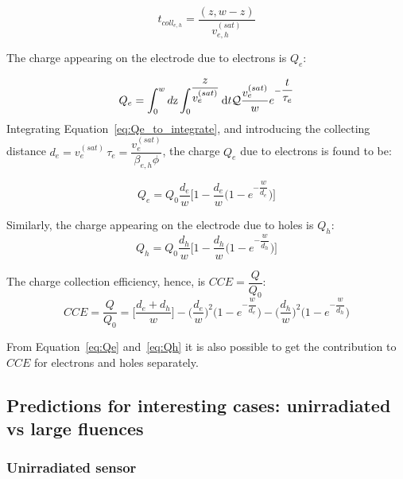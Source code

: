 \begin{equation}
t_{coll_{e,h}}=\dfrac{(z,w-z)}{v^{(sat)}_{e,h}}
\end{equation}

The charge appearing on the electrode due to electrons  is $Q_e$:

\begin{equation}
Q_e = \int_0^wd{\rm z}\int_0^{\dfrac{z}{v^{(sat)}_{e}}}{\rm d}t\mathcal{Q}\dfrac{v^{(sat)}_{e}}{w}e^{-\dfrac{t}{\tau_{e}}}
\label{eq:Qe_to_integrate}
\end{equation}
Integrating Equation~\ref{eq:Qe_to_integrate}, and introducing the collecting distance $d_e=v^{(sat)}_{e}\,\tau_{e}=\dfrac{v^{(sat)}_{e}}{\beta_{e,h}\phi}$, the charge  $Q_e$ due to electrons is found to be:

\begin{equation}
Q_e=Q_0\dfrac{d_e}{w}\Big[1-\dfrac{d_e}{w}\Big(1-e^{-\dfrac{w}{d_e}}\Big)\Big]
\label{eq:Qe}
\end{equation}

Similarly, the charge appearing on the electrode due to holes is $Q_h$:
\begin{equation}
Q_h=Q_0\dfrac{d_h}{w}\Big[1-\dfrac{d_h}{w}\Big(1-e^{-\dfrac{w}{d_h}}\Big)\Big]
\label{eq:Qh}
\end{equation}

The charge collection efficiency, hence, is  $CCE=\dfrac{Q}{Q_0}$:
\begin{equation}
CCE=\dfrac{Q}{Q_0}=\Big[\dfrac{d_e+d_h}{w}\Big]-\Big(\dfrac{d_e}{w}\Big)^2\Big(1-e^{-\dfrac{w}{d_e}}\Big)-\Big(\dfrac{d_h}{w}\Big)^2\Big(1-e^{-\dfrac{w}{d_h}}\Big)
\end{equation}

From Equation~\ref{eq:Qe} and~\ref{eq:Qh} it is also possible to get the contribution to $CCE$ 
for electrons and holes separately. 

\subsection{Predictions for interesting cases: unirradiated vs large fluences}

\subsubsection{Unirradiated sensor}

